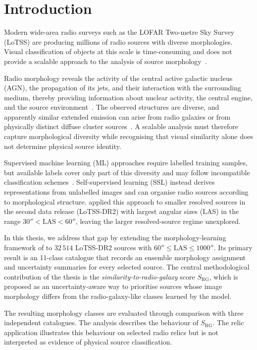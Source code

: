 \section{Introduction}
\label{sec:intro}

Modern wide-area radio surveys such as the LOFAR Two-metre Sky Survey (LoTSS) are producing millions of radio sources with diverse morphologies. Visual classification of objects at this scale is time-consuming and does not provide a scalable approach to the analysis of source morphology~\citep{Nicolas2025}.

Radio morphology reveals the activity of the central active galactic nucleus (AGN), the propagation of its jets, and their interaction with the surrounding medium, thereby providing information about nuclear activity, the central engine, and the source environment~\citep{Nicolas2025,Horton2025}.
The observed structures are diverse, and apparently similar extended emission can arise from radio galaxies or from physically distinct diffuse cluster sources~\citep{vanWeeren2019}.
A scalable analysis must therefore capture morphological diversity while recognising that visual similarity alone does not determine physical source identity.

Supervised machine learning (ML) approaches require labelled training samples, but available labels cover only part of this diversity and may follow incompatible classification schemes~\citep{Nicolas2025}.
Self-supervised learning (SSL) instead derives representations from unlabelled images and can organise radio sources according to morphological structure. \citet{Nicolas2025} applied this approach to smaller resolved sources in the second data release (LoTSS-DR2) with largest angular sizes (LAS) in the range $30'' < \mathrm{LAS} < 60''$, leaving the larger resolved-source regime unexplored.

In this thesis, we address that gap by extending the morphology-learning framework of \citet{Nicolas2025} to \(32\,514\) LoTSS-DR2 sources with \(60'' \leq \mathrm{LAS} \leq 1000''\).
Its primary result is an 11-class catalogue that records an ensemble morphology assignment and uncertainty summaries for every selected source.
The central methodological contribution of the thesis is the \textit{similarity-to-radio-galaxy} score $S_\mathrm{RG}$,
which is proposed as an uncertainty-aware way to prioritise sources whose image morphology differs from the radio-galaxy-like classes learned by the model.

The resulting morphology classes are evaluated through comparison with three independent catalogues.
The analysis describes the behaviour of $S_\mathrm{RG}$.
The relic application illustrates this behaviour on selected radio relics but is not interpreted as evidence of physical source classification.

